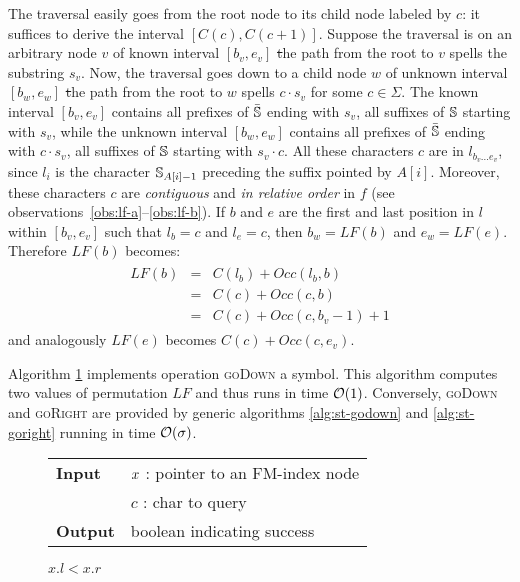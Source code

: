 The traversal easily goes from the root node to its child node labeled by $c$: it suffices to derive the interval $[C(c),C(c+1)]$.
Suppose the traversal is on an arbitrary node $v$ of known interval $[b_v, e_v]$ \st the path from the root to $v$ spells the substring $s_v$.
Now, the traversal goes down to a child node $w$ of unknown interval $[b_w, e_w]$ \st the path from the root to $w$ spells $c \cdot s_v$ for some $c \in \Sigma$.
The known interval $[b_v, e_v]$ contains all prefixes of $\bar{\mathbb {S}}$ ending with $s_v$, \ie all suffixes of $\mathbb {S}$ starting with $s_v$, while the unknown interval $[b_w, e_w]$ contains all prefixes of $\bar{\mathbb {S}}$ ending with $c \cdot s_v$, \ie all suffixes of $\mathbb {S}$ starting with $s_v \cdot c$.
All these characters $c$ are in $l_{b_v \dots e_v}$, since $l_i$ is the character $\mathbb {S}_{A[i] - 1}$ preceding the suffix pointed by $A[i]$.
Moreover, these characters $c$ are \emph{contiguous} and \emph{in relative order} in $f$ (see observations~\ref{obs:lf-a}--\ref{obs:lf-b}).
If $b$ and $e$ are the first and last position in $l$ within $[b_v, e_v]$ such that $l_b = c$ and $l_e = c$, then $b_w = LF(b)$ and $e_w = LF(e)$.
Therefore $LF(b)$ becomes:
\begin{eqnarray}
\begin{array}{lcl}
LF(b) &=& C(l_b) + Occ(l_b, b)\\
 	  &=& C(c) + Occ(c, b)\\
	  &=& C(c) + Occ(c, b_v - 1) + 1
\end{array}
\end{eqnarray}
and analogously $LF(e)$ becomes $C(c) + Occ(c, e_v)$.

Algorithm \ref{alg:fm-godownc} implements operation \textsc{goDown} a symbol.
This algorithm computes two values of permutation $LF$ and thus runs in time $\mathcal{O}(1)$.
Conversely, \textsc{goDown} and \textsc{goRight} are provided by generic algorithms \ref{alg:st-godown} and \ref{alg:st-goright} running in time $\mathcal{O}(\sigma)$.


\begin{figure*}
\begin{center}
\begin{minipage}[t]{.5\textwidth}
\begin{algorithm}[H]
\begin{tabular}{ll}
\textbf{Input}  & $x$ : pointer to an FM-index node\\
				& $c$ : char to query\\
\textbf{Output} & boolean indicating success\\
\end{tabular}
\begin{algorithmic}[1]
	\State \Return \False
\EndIf
{}
\State \Return $x.l < x.r$
\end{algorithmic}
\label{alg:fm-godownc}
\end{algorithm}
\end{minipage}
\end{center}
\end{figure*}

